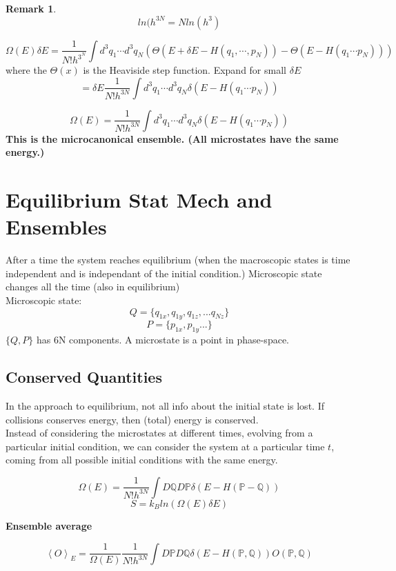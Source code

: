 \documentclass[11pt]{book}
\theoremstyle{definition}
\newtheorem{remark}{Remark}[section]
\begin{document}
\begin{remark}
	\[ ln(h^{3N} = Nln(h^{3}) \] 
\end{remark}

\begin{equation}
	\Omega(E)\delta E = \frac{1}{N!h^{3^{N}}} \int d^3 q_1 \cdots d^3 q_N (\Theta(E+\delta E -H(q_1, \cdots, p_N) ) -\Theta (E-H(q_1 \cdots p_N))) 
\end{equation}
where the $ \Theta (x) $ is the Heaviside step function.
Expand for small $ \delta E $ 
\[ = \delta E \frac{1}{N!h^{3N}} \int d^3 q_1 \cdots d^3 q_N \delta (E- H(q_1 \cdots p_N)) \] 

\begin{shaded*}
\begin{equation}
	\Omega(E) = \frac{1}{N!h^{3N}} \int d^3 q_1 \cdots d^3 q_N \delta (E- H(q_1 \cdots p_N)) 
\end{equation}
\textbf{This is the microcanonical ensemble. (All microstates have the same energy.)} 
\end{shaded*}

\section{Equilibrium Stat Mech and Ensembles}
After a time the system reaches equilibrium (when the macroscopic states is time independent and is independant of the initial condition.)
Microscopic state changes all the time (also in equilibrium) \\
Microscopic state: 
$$ Q = \{q_{1x}, q_{1y}, q_{1z}, ... q_{Nz}\} $$
\[ P = \{p_{1x}, p_{1y} ...\}\] 
$ \{Q,P\} $ has 6N components.
A microstate is a point in phase-space.
\subsection{Conserved Quantities}
In the approach to equilibrium, not all info about the initial state is lost. If collisions conserves energy, then (total) energy is conserved. \\
Instead of considering the microstates at different times, evolving from a particular initial condition, we can consider the system at a particular time $ t $, coming from all possible initial conditions with the same energy.

\[ \Omega(E) = \frac{1}{N!h^{3N}} \int D\mathbb{Q} D\mathbb{P} \delta(E - H(\mathbb{P} - \mathbb{Q}))\] 
\begin{equation}
	S = k_B ln(\Omega(E)\delta E)
\end{equation}

\textbf{Ensemble average}

\[ \left \langle   O \right \rangle_E = \frac{1}{\Omega(E)} \frac{1}{N!h^{3N}}\int D\mathbb{P} D \mathbb{Q} \delta(E-H(\mathbb{P},\mathbb{Q}))O(\mathbb{P},\mathbb{Q})\] 
\end{document}
